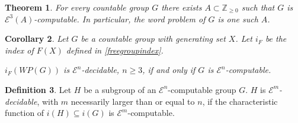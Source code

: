 \documentclass[a4paper]{article}
\newcommand{\grz}[1]{$\mathcal{E}^{#1}$}	%
\newcommand{\ZZ}{\mathbb{Z}}
\theoremstyle{plain}
\newtheorem{theorem}{Theorem}[section]
\newtheorem{corollary}[theorem]{Corollary}
\theoremstyle{definition}
\newtheorem{definition}[theorem]{Definition}
\begin{document}
\begin{theorem} \cite[Theorem 3.2]{Cannonito_1973} \label{wp-computable-implies-group}
	For every countable group $G$ there exists $A \subset \ZZ_{\geq 0}$ such that $G$ is \grz{3}$(A)$-computable. In particular, the word problem of $G$ is one such $A$.
\end{theorem}

\begin{corollary} \label{wp-iff-group}
	Let $G$ be a countable group with generating set $X$. Let $i_F$ be the index of $F(X)$ defined in \ref{freegroupindex}.
	
	$i_F(WP(G))$ is \grz{n}-decidable, $n \geq 3$, if and only if $G$ is \grz{n}-computable. 
\end{corollary}

\begin{definition}
	Let $H$ be a subgroup of an \grz{n}-computable group $G$. $H$ is {\it \grz{m}-decidable}, with $m$ necessarily larger than or equal to $n$, if the characteristic function of $i(H) \subseteq i(G)$ is \grz{m}-computable.
\end{definition}
\end{document}

